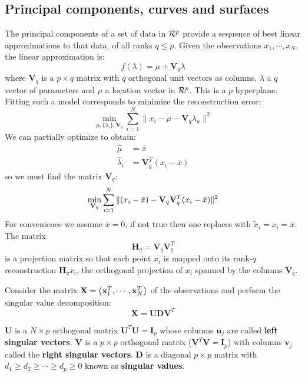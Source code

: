 \documentclass[12pt, letterpaper]{article}
\theoremstyle{definition}
\newcommand{\X}{\mathrm{\mathbf{X}}}
\newcommand{\I}{\mathrm{\mathbf{I}}}
\newcommand{\x}{\mathbf{x}}
\DeclarePairedDelimiter\autobracket{(}{)}
\newcommand{\br}[1]{\autobracket*{#1}}
\begin{document}
\subsection{Principal components, curves and surfaces}
The principal components of a set of data in $\CMcal{R}^p$ provide a sequence of best linear approximations to that data, of all ranks $q \le p$. Given the observations $x_1, \cdots, x_N$, the linear approximation is:
\begin{equation}
f(\lambda) = \mu  + \mathbf{V}_q\lambda
\end{equation}
where $\mathbf{V}_q$ is a $p\times q$ matrix with $q$ orthogonal unit vectors as columns, $\lambda$ a $q$ vector of parameters and $\mu$ a location vector in $\CMcal{R}^p$. This is a $p$ hyperplane. Fitting such a model corresponds to minimize the reconstruction error:
\begin{equation}
\min_{\mu, \{\lambda_i\}, \mathbf{V}_q} \sum_{i=1}^N \| x_i -\mu - \mathbf{V}_q\lambda_u \|^2
\end{equation}
We can partially optimize to obtain:
\begin{equation}
\begin{aligned}
\hat{\mu} &= \bar{x}\\
\hat{\lambda}_i &= \mathbf{V}_q^T (x_i - \bar{x})
\end{aligned}
\end{equation}
so we must find the matrix $\mathbf{V}_q$:
\begin{equation}
\min_{\mathbf{V}_q} \sum_{i=1}^N  \| \br{x_i - \bar{x}} -\mathbf{V}_q\mathbf{V}_q^T\br{x_i - \bar{x}}\|^2
\end{equation}
For convenience we assume $\bar{x}=0$, if not true then one replaces with $\tilde{x}_i = x_i = \bar{x}$.
The matrix
\begin{equation}
\mathbf{H}_q = \mathbf{V}_q \mathbf{V}_q^T
\end{equation}
is a projection matrix so that each point $x_i$ is mapped onto its rank-$q$ reconstruction $\mathbf{H}_q x_i$, the orthogonal projection of $x_i$ spanned by the columns $\mathbf{V}_q$.

Consider the matrix $\X = \br{\x_1^T, \cdots, \x_N^T}$ of the observations and perform the singular value decomposition:
\begin{equation}
\X = \mathbf{U}\mathbf{D}\mathbf{V}^T
\end{equation}

$\mathbf{U}$ is a $N\times p$ orthogonal matrix $\mathbf{U}^T\mathbf{U}=\I_p$ whose columns $\mathbf{u}_j$ are called \textbf{left singular vectors}. $\mathbf{V}$ is a $p\times p$ orthogonal matrix ($\mathbf{V}^T\mathbf{V}=\I_p$) with columns $\mathbf{v}_j$ called the \textbf{right singular vectors}. $\mathbf{D}$ is a diagonal $p\times p$ matrix with $d_1\ge d_2\ge \cdots\ge d_p\ge 0$ known as \textbf{singular values}. 
\end{document}
